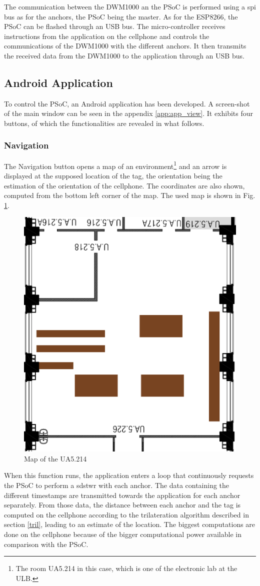 The communication between the DWM1000 an the PSoC is performed using a \gls{spi} bus as for the anchors, the PSoC being the master. As for the ESP8266, the PSoC can be flashed through an USB bus. The micro-controller receives instructions from the application on the cellphone and controls the communications of the DWM1000 with the different anchors. It then transmits the received data from the DWM1000 to the application through an USB bus.

\subsection{Android Application}

To control the PSoC, an Android application has been developed. A screen-shot of the main window can be seen in the appendix \ref{app:app_view}. It exhibits four buttons, of which the functionalities are revealed in what follows.

\subsubsection{Navigation}

The Navigation button opens a map of an environment\footnote{The room UA5.214 in this case, which is one of the electronic lab at the ULB.} and an arrow is displayed at the supposed location of the tag, the orientation being the estimation of the orientation of the cellphone. The coordinates are also shown, computed from the bottom left corner of the map. The used map is shown in Fig. \ref{fig:ua5_map}.

\begin{figure}[H]
	\centering
	\includegraphics[width=.4\linewidth]{Images/little_room.png}
	\caption{Map of the UA5.214}
	\label{fig:ua5_map}
\end{figure}

When this function runs, the application enters a loop that continuously requests the PSoC to perform a \gls{sdstwr} with each anchor. The data containing the different timestamps are transmitted towards the application for each anchor separately. From those data, the distance between each anchor and the tag is computed on the cellphone according to the trilateration algorithm described in section \ref{tril}, leading to an estimate of the location. The biggest computations are done on the cellphone because of the bigger computational power available in comparison with the PSoC.
\vspace{2mm}

